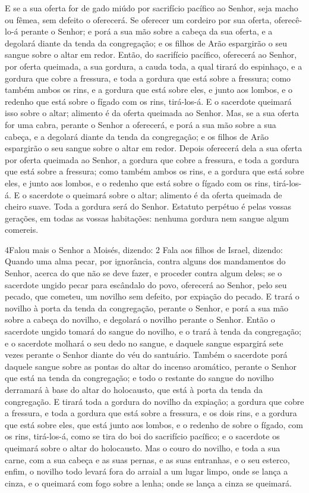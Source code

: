 E se a sua oferta for de gado miúdo por sacrifício pacífico ao
Senhor, seja macho ou fêmea, sem defeito o oferecerá. Se
oferecer um cordeiro por sua oferta, oferecê-lo-á perante o Senhor;
e porá a sua mão sobre a cabeça da sua oferta, e a degolará
diante da tenda da congregação; e os filhos de Arão espargirão o seu
sangue sobre o altar em redor. Então, do sacrifício pacífico,
oferecerá ao Senhor, por oferta queimada, a sua gordura, a cauda
toda, a qual tirará do espinhaço, e a gordura que cobre a fressura,
e toda a gordura que está sobre a fressura; como também ambos
os rins, e a gordura que está sobre eles, e junto aos lombos, e o
redenho que está sobre o fígado com os rins, tirá-los-á. E o
sacerdote queimará isso sobre o altar; alimento é da oferta queimada
ao Senhor. Mas, se a sua oferta for uma cabra, perante o
Senhor a oferecerá, e porá a sua mão sobre a sua cabeça, e a
degolará diante da tenda da congregação; e os filhos de Arão
espargirão o seu sangue sobre o altar em redor. Depois
oferecerá dela a sua oferta por oferta queimada ao Senhor, a gordura
que cobre a fressura, e toda a gordura que está sobre a fressura;
como também ambos os rins, e a gordura que está sobre eles, e
junto aos lombos, e o redenho que está sobre o fígado com os rins,
tirá-los-á. E o sacerdote o queimará sobre o altar; alimento
é da oferta queimada de cheiro suave. Toda a gordura será do Senhor.
Estatuto perpétuo é pelas vossas gerações, em todas as vossas
habitações: nenhuma gordura nem sangue algum comereis.

\medskip

\lettrine{4} Falou mais o Senhor a Moisés, dizendo: 2 Fala aos
filhos de Israel, dizendo: Quando uma alma pecar, por ignorância,
contra alguns dos mandamentos do Senhor, acerca do que não se deve
fazer, e proceder contra algum deles; se o sacerdote ungido
pecar para escândalo do povo, oferecerá ao Senhor, pelo seu pecado,
que cometeu, um novilho sem defeito, por expiação do pecado. E
trará o novilho à porta da tenda da congregação, perante o Senhor, e
porá a sua mão sobre a cabeça do novilho, e degolará o novilho
perante o Senhor. Então o sacerdote ungido tomará do sangue do
novilho, e o trará à tenda da congregação; e o sacerdote molhará
o seu dedo no sangue, e daquele sangue espargirá sete vezes perante
o Senhor diante do véu do santuário. Também o sacerdote porá
daquele sangue sobre as pontas do altar do incenso aromático,
perante o Senhor que está na tenda da congregação; e todo o restante
do sangue do novilho derramará à base do altar do holocausto, que
está à porta da tenda da congregação. E tirará toda a gordura do
novilho da expiação; a gordura que cobre a fressura, e toda a
gordura que está sobre a fressura, e os dois rins, e a gordura
que está sobre eles, que está junto aos lombos, e o redenho de sobre
o fígado, com os rins, tirá-los-á, como se tira do boi do
sacrifício pacífico; e o sacerdote os queimará sobre o altar do
holocausto. Mas o couro do novilho, e toda a sua carne, com a
sua cabeça e as suas pernas, e as suas entranhas, e o seu esterco,
enfim, o novilho todo levará fora do arraial a um lugar
limpo, onde se lança a cinza, e o queimará com fogo sobre a lenha;
onde se lança a cinza se queimará.

